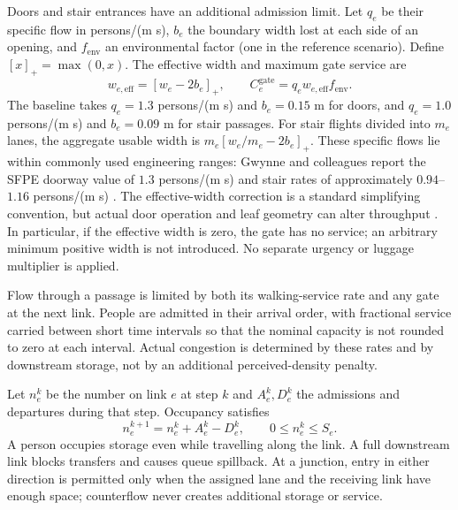 \documentclass[11pt,a4paper]{article}
\begin{document}
Doors and stair entrances have an additional admission limit. Let $q_e$ be their specific flow in persons/(m s), $b_e$ the boundary width lost at each side of an opening, and $f_{\mathrm{env}}$ an environmental factor (one in the reference scenario). Define $[x]_+=\max(0,x)$. The effective width and maximum gate service are
\begin{equation}\label{eq:gate}
w_{e,\mathrm{eff}}=[w_e-2b_e]_+,
\qquad C_e^{\mathrm{gate}}=q_ew_{e,\mathrm{eff}}f_{\mathrm{env}}.
\end{equation}
The baseline takes $q_e=1.3$ persons/(m s) and $b_e=0.15$ m for doors, and $q_e=1.0$ persons/(m s) and $b_e=0.09$ m for stair passages. For stair flights divided into $m_e$ lanes, the aggregate usable width is $m_e[w_e/m_e-2b_e]_+$. These specific flows lie within commonly used engineering ranges: Gwynne and colleagues report the SFPE doorway value of $1.3$ persons/(m s) and stair rates of approximately $0.94$--$1.16$ persons/(m s) \cite{gwynne}. The effective-width correction is a standard simplifying convention, but actual door operation and leaf geometry can alter throughput \cite{gwynne}. In particular, if the effective width is zero, the gate has no service; an arbitrary minimum positive width is not introduced. No separate urgency or luggage multiplier is applied.

Flow through a passage is limited by both its walking-service rate and any gate at the next link. People are admitted in their arrival order, with fractional service carried between short time intervals so that the nominal capacity is not rounded to zero at each interval. Actual congestion is determined by these rates and by downstream storage, not by an additional perceived-density penalty.

Let $n_e^k$ be the number on link $e$ at step $k$ and $A_e^k,D_e^k$ the admissions and departures during that step. Occupancy satisfies
\begin{equation}\label{eq:occupancy}
n_e^{k+1}=n_e^k+A_e^k-D_e^k,\qquad 0\leq n_e^k\leq S_e.
\end{equation}
A person occupies storage even while travelling along the link. A full downstream link blocks transfers and causes queue spillback. At a junction, entry in either direction is permitted only when the assigned lane and the receiving link have enough space; counterflow never creates additional storage or service.
\end{document}
